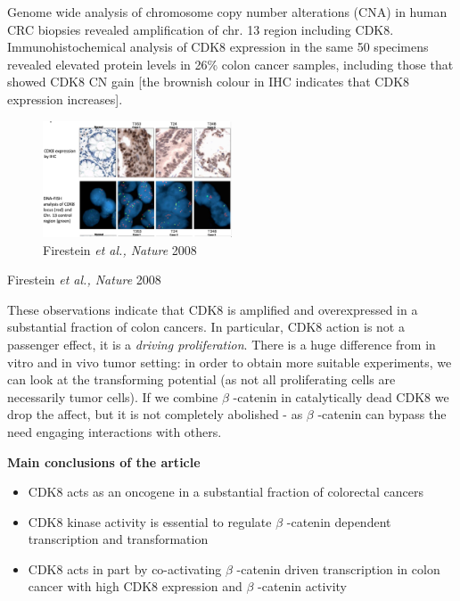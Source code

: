 Genome wide analysis of chromosome copy number alterations (CNA) in human CRC biopsies revealed amplification of chr. 13 region including CDK8. Immunohistochemical analysis of CDK8 expression in the same 50 specimens revealed elevated protein levels in 26\% colon cancer samples, including those that showed CDK8 CN gain {[}the brownish colour in IHC indicates that CDK8 expression increases{]}.

\begin{figure}
\centering
\includegraphics[width=0.5\textwidth]{../_resources/Screenshot_2022-10-10_at_12-23-14.png}
\caption{Firestein \emph{et al., Nature} 2008}
\end{figure}

Firestein \emph{et al., Nature} 2008

These observations indicate that CDK8 is amplified and overexpressed in a substantial fraction of colon cancers. In particular, CDK8 action is not a passenger effect, it is a \emph{driving proliferation}. There is a huge difference from in vitro and in vivo tumor setting: in order to obtain more suitable experiments, we can look at the transforming potential (as not all proliferating cells are necessarily tumor cells). If we combine $\beta$  -catenin in catalytically dead CDK8 we drop the affect, but it is not completely abolished - as $\beta$  -catenin can bypass the need engaging interactions with others.

\textbf{Main conclusions of the article}

\begin{itemize}
\tightlist
\item
  CDK8 acts as an oncogene in a substantial fraction of colorectal cancers
\item
  CDK8 kinase activity is essential to regulate $\beta$  -catenin dependent transcription and transformation
\item
  CDK8 acts in part by co-activating $\beta$  -catenin driven transcription in colon cancer with high CDK8 expression and $\beta$  -catenin activity
\end{itemize}

